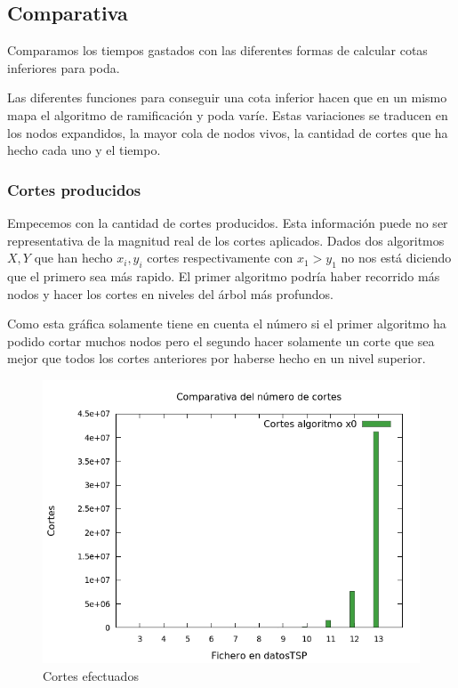 \subsection{Comparativa}
Comparamos los tiempos gastados con las diferentes formas de calcular cotas inferiores para poda.

Las diferentes funciones para conseguir una cota inferior hacen que en un mismo mapa
el algoritmo de ramificación y poda varíe. 
Estas variaciones se traducen en los nodos expandidos, la mayor cola de nodos vivos, la cantidad de
cortes que ha hecho cada uno y el tiempo.


\subsubsection{Cortes producidos}
Empecemos con la cantidad de cortes producidos. Esta información puede no ser representativa de la
magnitud real de los cortes aplicados. Dados dos algoritmos $X,Y$ que han hecho $x_i,y_i$ cortes
respectivamente con $x_1>y_1$ no nos está diciendo que el primero sea más rapido.
El primer algoritmo podría haber recorrido más nodos y hacer los cortes en niveles del árbol más profundos. 

Como esta gráfica solamente tiene en cuenta el número si el primer algoritmo ha podido 
cortar muchos nodos pero el segundo hacer solamente un corte que sea mejor que todos los cortes
anteriores por haberse hecho en un nivel superior.
 
\begin{figure}[H]
    \centering
    \includegraphics[scale=0.65]{../TSP/Graficas/graficaCortes.png}
    \caption{Cortes efectuados}
\end{figure}


